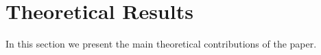 \documentclass{article}
\theoremstyle{plain}
\newtheorem{lemma}[theorem]{Lemma}
\theoremstyle{definition}
\theoremstyle{remark}
\begin{document}




\section{Theoretical Results}
\label{sec:theory}

In this section we present the main theoretical contributions of the paper.
\end{document}
